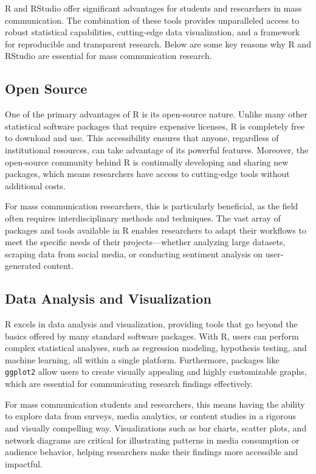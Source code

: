 \documentclass[
]{book}
\begin{document}
R and RStudio offer significant advantages for students and researchers in mass communication. The combination of these tools provides unparalleled access to robust statistical capabilities, cutting-edge data visualization, and a framework for reproducible and transparent research. Below are some key reasons why R and RStudio are essential for mass communication research.

\subsection*{Open Source}\label{open-source}

One of the primary advantages of R is its open-source nature. Unlike many other statistical software packages that require expensive licenses, R is completely free to download and use. This accessibility ensures that anyone, regardless of institutional resources, can take advantage of its powerful features. Moreover, the open-source community behind R is continually developing and sharing new packages, which means researchers have access to cutting-edge tools without additional costs.

For mass communication researchers, this is particularly beneficial, as the field often requires interdisciplinary methods and techniques. The vast array of packages and tools available in R enables researchers to adapt their workflows to meet the specific needs of their projects---whether analyzing large datasets, scraping data from social media, or conducting sentiment analysis on user-generated content.

\subsection*{Data Analysis and Visualization}\label{data-analysis-and-visualization}

R excels in data analysis and visualization, providing tools that go beyond the basics offered by many standard software packages. With R, users can perform complex statistical analyses, such as regression modeling, hypothesis testing, and machine learning, all within a single platform. Furthermore, packages like \texttt{ggplot2} allow users to create visually appealing and highly customizable graphs, which are essential for communicating research findings effectively.

For mass communication students and researchers, this means having the ability to explore data from surveys, media analytics, or content studies in a rigorous and visually compelling way. Visualizations such as bar charts, scatter plots, and network diagrams are critical for illustrating patterns in media consumption or audience behavior, helping researchers make their findings more accessible and impactful.
\end{document}
